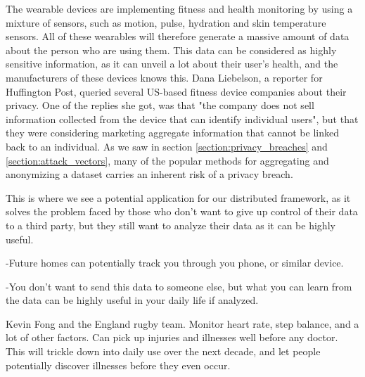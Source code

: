 The wearable devices are implementing fitness and health monitoring by using a mixture of sensors, such as motion, pulse, hydration and skin temperature sensors. All of these wearables will therefore generate a massive amount of data about the person who are using them. This data can be considered as highly sensitive information, as it can unveil a lot about their user's health, and the manufacturers of these devices knows this. Dana Liebelson, a reporter for Huffington Post, queried several US-based fitness device companies about their privacy. One of the replies she got, was that "the company does not sell information collected from the device that can identify individual users", but that they were considering marketing aggregate information that cannot be linked back to an individual. As we saw in section \ref{section:privacy_breaches} and \ref{section:attack_vectors}, many of the popular methods for aggregating and anonymizing a dataset carries an inherent risk of a privacy breach.

This is where we see a potential application for our distributed framework, as it solves the problem faced by those who don't want to give up control of their data to a third party, but they still want to analyze their data as it can be highly useful. 

-Future homes can potentially track you through you phone, or similar device. 

-You don't want to send this data to someone else, but what you can learn from the data can be highly useful in your daily life if analyzed. 

Kevin Fong and the England rugby team. Monitor heart rate, step balance, and a lot of other factors. Can pick up injuries and illnesses well before any doctor. This will trickle down into daily use over the next decade, and let people potentially discover illnesses before they even occur. 


\cleardoublepage